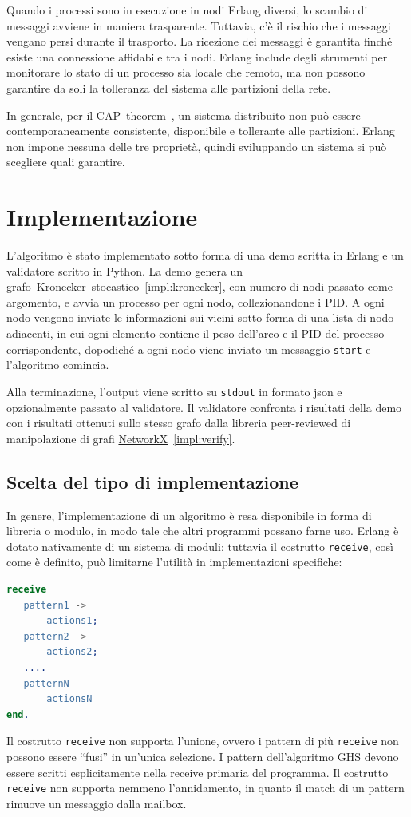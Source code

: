 \documentclass[target=bach,aauheader=,style=]{thud}
\newcommand{\eng}[1]{\foreignlanguage{english}{#1}}
\begin{document}
Quando i processi sono in esecuzione in nodi Erlang diversi, lo scambio di messaggi avviene in maniera trasparente. Tuttavia, c'è il rischio che i messaggi vengano persi durante il trasporto. La ricezione dei messaggi è garantita finché esiste una connessione affidabile tra i nodi. Erlang include degli strumenti per monitorare lo stato di un processo sia locale che remoto, ma non possono garantire da soli la tolleranza del sistema alle partizioni della rete.

In generale, per il CAP~\eng{theorem}~\cite{10.1145/564585.564601}, un sistema distribuito non può essere contemporaneamente consistente, disponibile e tollerante alle partizioni. Erlang non impone nessuna delle tre proprietà, quindi sviluppando un sistema si può scegliere quali garantire.

\chapter{Implementazione}

L'algoritmo è stato implementato sotto forma di una demo scritta in Erlang e un validatore scritto in Python. La demo genera un grafo~Kronecker~stocastico~\ref{impl:kronecker}, con numero di nodi passato come argomento, e avvia un processo per ogni nodo, collezionandone i PID. A ogni nodo vengono inviate le informazioni sui vicini sotto forma di una lista di nodo adiacenti, in cui ogni elemento contiene il peso dell'arco e il PID del processo corrispondente, dopodiché a ogni nodo viene inviato un messaggio \lstinline{start} e l'algoritmo comincia.

Alla terminazione, l'\eng{output} viene scritto su \lstinline{stdout} in formato json e opzionalmente passato al validatore. Il validatore confronta i risultati della demo con i risultati ottenuti sullo stesso grafo dalla libreria \eng{peer-reviewed} di manipolazione di grafi \href{https://networkx.org/}{NetworkX}~\ref{impl:verify}.

\section{Scelta del tipo di implementazione}

In genere, l'implementazione di un algoritmo è resa disponibile in forma di libreria o modulo, in modo tale che altri programmi possano farne uso. Erlang è dotato nativamente di un sistema di moduli; tuttavia il costrutto \lstinline{receive}, così come è definito, può limitarne l'utilità in implementazioni specifiche:
\begin{lstlisting}[language=Erlang]
receive
   pattern1 ->
       actions1;
   pattern2 ->
       actions2;
   ....
   patternN
       actionsN
end.
\end{lstlisting}
Il costrutto \lstinline{receive} non supporta l'unione, ovvero i pattern di più \lstinline{receive} non possono essere ``fusi'' in un'unica selezione. I pattern dell'algoritmo GHS devono essere scritti esplicitamente nella \eng{receive} primaria del programma. Il costrutto \lstinline{receive} non supporta nemmeno l'annidamento, in quanto il match di un pattern rimuove un messaggio dalla \eng{mailbox}.
\end{document}
